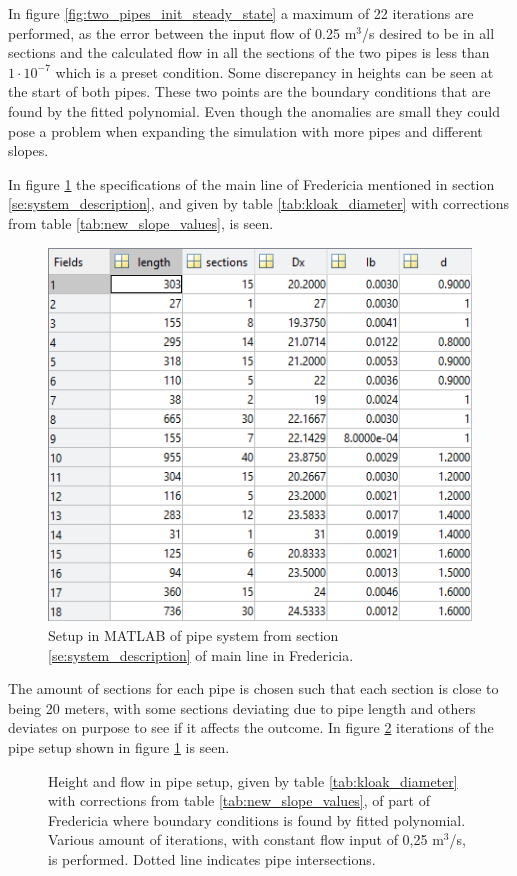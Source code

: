 {In figure \ref{fig:two_pipes_init_steady_state} a maximum of 22 iterations are performed, as the error between the input flow of 0.25 $\text{m}^\text{3}$/s desired to be in all sections and the calculated flow in all the sections of the two pipes is less than $1\cdot10^{-7}$ which is a preset condition. 
Some discrepancy in heights can be seen at the start of both pipes. These two points are the boundary conditions that are found by the fitted polynomial. Even though the anomalies are small they could pose a problem when expanding the simulation with more pipes and different slopes. 

In figure \ref{fig:Fredericia_pipe_setup} the specifications of the main line of Fredericia mentioned in section \ref{se:system_description}, and given by table \ref{tab:kloak_diameter} with corrections from table \ref{tab:new_slope_values}, is seen.

\begin{figure}[H]
\centering
\includegraphics[width=0.6 \textwidth]{report/simulation/pictures/Fredericia_pipe_setup.PNG}
\caption{Setup in MATLAB of pipe system from section \ref{se:system_description} of main line in Fredericia.}
\label{fig:Fredericia_pipe_setup}
\end{figure}

The amount of sections for each pipe is chosen such that each section is close to being 20 meters, with some sections deviating due to pipe length and others deviates on purpose to see if it affects the outcome.  
In figure \ref{fig:fredericia_init_steady_state} iterations of the pipe setup shown in figure \ref{fig:Fredericia_pipe_setup} is seen. 

\begin{figure}[H]
 \centering
 
\caption{Height and flow in pipe setup, given by table \ref{tab:kloak_diameter} with corrections from table \ref{tab:new_slope_values}, of part of Fredericia where boundary conditions is found by fitted polynomial. Various amount of iterations, with constant flow input of 0,25 $\text{m}^\text{3}$/s, is performed. Dotted line indicates pipe intersections.}
\label{fig:fredericia_init_steady_state}
\end{figure}

}
